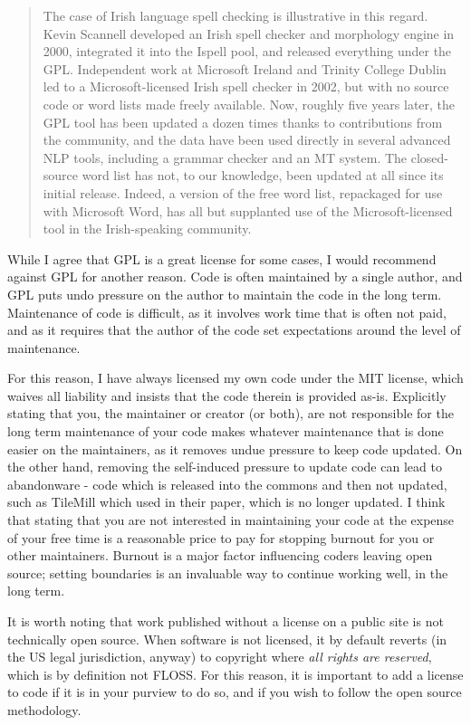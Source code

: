 \begin{quote}
The case of Irish language spell checking is illustrative in this regard. Kevin Scannell developed an Irish spell checker and morphology engine in 2000, integrated it into the Ispell pool, and released everything under the GPL. Independent work at Microsoft Ireland and Trinity College Dublin led to a Microsoft-licensed Irish spell checker in 2002, but with no source code or word lists made freely available. Now, roughly five years later, the GPL tool has been updated a dozen times thanks to contributions from the community, and the data have been used directly in several advanced NLP tools, including a grammar checker and an MT system. The closed-source word list has not, to our knowledge, been updated at all since its initial release. Indeed, a version of the free word list, repackaged for use with Microsoft Word, has all but supplanted use of the Microsoft-licensed tool in the Irish-speaking community. \citep[282-283]{streiter2006implementing}
\end{quote}

While I agree that GPL is a great license for some cases, I would recommend against GPL for another reason. Code is often maintained by a single author, and GPL puts undo pressure on the author to maintain the code in the long term. Maintenance of code is difficult, as it involves work time that is often not paid, and as it requires that the author of the code set expectations around the level of maintenance.

For this reason, I have always licensed my own code under the MIT license, which waives all liability and insists that the code therein is provided as-is. Explicitly stating that you, the maintainer or creator (or both), are not responsible for the long term maintenance of your code makes whatever maintenance that is done easier on the maintainers, as it removes undue pressure to keep code updated. On the other hand, removing the self-induced pressure to update code can lead to abandonware - code which is released into the commons and then not updated, such as TileMill which \citet{gawne2016mapmaking} used in their paper, which is no longer updated. I think that stating that you are not interested in maintaining your code at the expense of your free time is a reasonable price to pay for stopping burnout for you or other maintainers. Burnout is a major factor influencing coders leaving open source; setting boundaries is an invaluable way to continue working well, in the long term.

It is worth noting that work published without a license on a public site is not technically open source. When software is not licensed, it by default reverts (in the US legal jurisdiction, anyway) to copyright where {\it all rights are reserved}, which is by definition not FLOSS. For this reason, it is important to add a license to code if it is in your purview to do so, and if you wish to follow the open source methodology.

